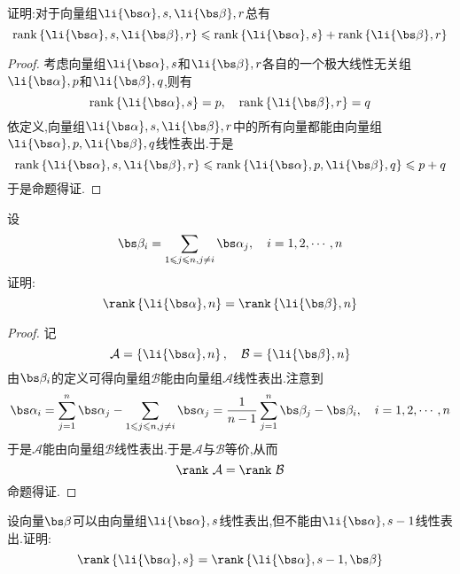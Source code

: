 \documentclass{ctexart}
\begin{document}
\begin{problem}
    证明:对于向量组$\li{\bs\alpha},s,\li{\bs\beta},r$总有
    \[\text{rank}\left\{\li{\bs\alpha},s,\li{\bs\beta},r\right\}\leqslant\text{rank}\left\{\li{\bs\alpha},s\right\}+\text{rank}\left\{\li{\bs\beta},r\right\}\]
\end{problem}
\begin{proof}
    考虑向量组$\li{\bs\alpha},s$和$\li{\bs\beta},r$各自的一个极大线性无关组$\li{\bs\alpha},p$和$\li{\bs\beta},q$,则有
    \[\text{rank}\left\{\li{\bs\alpha},s\right\}=p,\quad\text{rank}\left\{\li{\bs\beta},r\right\}=q\]
    依定义,向量组$\li{\bs\alpha},s,\li{\bs\beta},r$中的所有向量都能由向量组$\li{\bs\alpha},p,\li{\bs\beta},q$线性表出.于是
    \[\text{rank}\left\{\li{\bs\alpha},s,\li{\bs\beta},r\right\}\leqslant\text{rank}\left\{\li{\bs\alpha},p,\li{\bs\beta},q\right\}\leqslant p+q\]
    于是命题得证.
\end{proof}
\begin{problem}
    设
    \[\bs\beta_i=\sum_{1\leqslant j\leqslant n,j\neq i}\bs\alpha_j,\quad i=1,2,\cdots,n\]
    证明:
    \[\rank\left\{\li{\bs\alpha},n\right\}=\rank\left\{\li{\bs\beta},n\right\}\]
\end{problem}
\begin{proof}
    记
    \[\mathcal{A}=\left\{\li{\bs\alpha},n\right\},\quad\mathcal{B}=\left\{\li{\bs\beta},n\right\}\]
    由$\bs\beta_i$的定义可得向量组$\mathcal{B}$能由向量组$\mathcal{A}$线性表出.注意到
    \[\bs\alpha_i=\sum_{j=1}^{n}\bs\alpha_j-\sum_{1\leqslant j\leqslant n,j\neq i}\bs\alpha_j=\dfrac{1}{n-1}\sum_{j=1}^{n}\bs\beta_j-\bs\beta_i,\quad i=1,2,\cdots,n\]
    于是$\mathcal{A}$能由向量组$\mathcal{B}$线性表出.于是$\mathcal{A}$与$\mathcal{B}$等价,从而
    \[\rank\ \mathcal{A}=\rank\ \mathcal{B}\]
    命题得证.
\end{proof}
\begin{problem}
    设向量$\bs\beta$可以由向量组$\li{\bs\alpha},s$线性表出,但不能由$\li{\bs\alpha},{s-1}$线性表出.证明:
    \[\rank\left\{\li{\bs\alpha},s\right\}=\rank\left\{\li{\bs\alpha},{s-1},\bs\beta\right\}\]
\end{problem}
\end{document}
